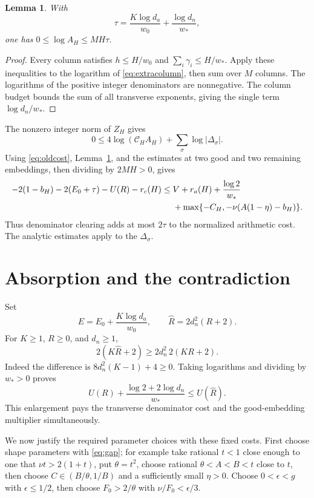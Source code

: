 \documentclass[11pt]{article}
\newtheorem{lemma}[theorem]{Lemma}
\theoremstyle{remark}
\begin{document}
\begin{lemma}\label{lem:cost}
With
\begin{equation}\label{eq:tau}
\tau=\frac{K\log d_a}{w_0}+\frac{\log d_n}{w_*},
\end{equation}
one has $0\le\log A_H\le MH\tau$.
\end{lemma}
\begin{proof}
Every column satisfies $h\le H/w_0$ and
$\sum_i\gamma_i\le H/w_*$. Apply these inequalities to the logarithm
of \eqref{eq:extracolumn}, then sum over $M$ columns. The logarithms
of the positive integer denominators are nonnegative. The column budget
bounds the sum of all transverse exponents, giving the single term
$\log d_n/w_*$.
\end{proof}

The nonzero integer norm of $Z_H$ gives
\[
0\le4\log(\mathscr C_H A_H)+\sum_\sigma\log|\Delta_\sigma|.
\]
Using \eqref{eq:oldcost}, Lemma~\ref{lem:cost}, and the estimates at
two good and two remaining embeddings, then dividing by $2MH>0$,
gives
\begin{align}
-2(1-b_H)-2(E_0+\tau)-U(R)-r_c(H)
\le{}&V+r_a(H)+\frac{\log2}{w_*}\notag\\
&+\max\{-C_H,-\nu(A(1-\eta)-b_H)\}.\label{eq:combined}
\end{align}
Thus denominator clearing adds at most $2\tau$ to the normalized
arithmetic cost. The analytic estimates apply to the $\Delta_\sigma$.

\section{Absorption and the contradiction}\label{sec:absorption}
Set
\[
E=E_0+\frac{K\log d_a}{w_0},\qquad
\widehat R=2d_n^2(R+2).
\]
For $K\ge1$, $R\ge0$, and $d_n\ge1$,
\[
2(K\widehat R+2)\ge 2d_n^2\,2(KR+2).
\]
Indeed the difference is $8d_n^2(K-1)+4\ge0$. Taking logarithms
and dividing by $w_*>0$ proves
\begin{equation}\label{eq:absorb}
U(R)+\frac{\log2+2\log d_n}{w_*}\le U(\widehat R).
\end{equation}
This enlargement pays the transverse denominator cost and the
good-embedding multiplier simultaneously.

We now justify the required parameter choices with these fixed costs.
First choose shape parameters with \eqref{eq:gap}; for example take
rational $t<1$ close enough to one that $\nu t>2(1+t)$, put
$\theta=t^2$, choose rational $\theta<A<B<t$ close to $t$, then
choose $C\in(B/\theta,1/B)$ and a sufficiently small $\eta>0$.
Choose $0<\epsilon<g$ with $\epsilon\le1/2$, then choose
$F_0>2/\theta$ with $\nu/F_0<\epsilon/3$.
\end{document}

